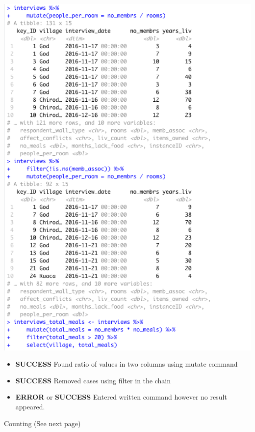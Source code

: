 \documentclass{article}
\begin{document}
\includegraphics[width=\textwidth]{Images/RStudio_15.png}
\begin{itemize}
\item \textbf{SUCCESS} Found ratio of values in two columns using mutate command
\item \textbf{SUCCESS} Removed cases using filter in the chain
\item \textbf{ERROR} or \textbf{SUCCESS} Entered written command however no result appeared.
\end{itemize}
Counting (See next page) \\
\end{document}
